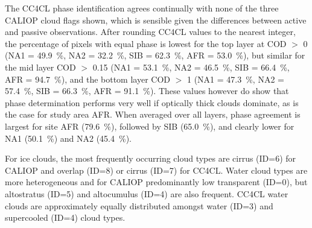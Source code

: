 The CC4CL phase identification agrees continually with none of the three CALIOP cloud flags shown, which is sensible given the differences between active and passive observations. After rounding CC4CL values to the nearest integer, the percentage of pixels with equal phase is lowest for the top layer at COD $>$ 0 (NA1 = 49.9~\%, NA2 = 32.2~\%, SIB = 62.3~\%, AFR = 53.0~\%), but similar for the mid layer COD $>$ 0.15 (NA1 = 53.1~\%, NA2 = 46.5~\%, SIB = 66.4~\%, AFR = 94.7~\%), and the bottom layer COD $>$ 1 (NA1 = 47.3~\%, NA2 = 57.4~\%, SIB = 66.3~\%, AFR = 91.1~\%). These values however do show that phase determination performs very well if optically thick clouds dominate, as is the case for study area AFR. When averaged over all layers, phase agreement is largest for site AFR (79.6~\%), followed by SIB (65.0~\%), and clearly lower for NA1 (50.1~\%) and NA2 (45.4~\%).

For ice clouds, the most frequently occurring cloud types are cirrus (ID=6) for CALIOP and overlap (ID=8) or cirrus (ID=7) for CC4CL. Water cloud types are more heterogeneous and for CALIOP predominantly low transparent (ID=0), but altostratus (ID=5) and altocumulus (ID=4) are also frequent. CC4CL water clouds are approximately equally distributed amongst water (ID=3) and supercooled (ID=4) cloud types. %

